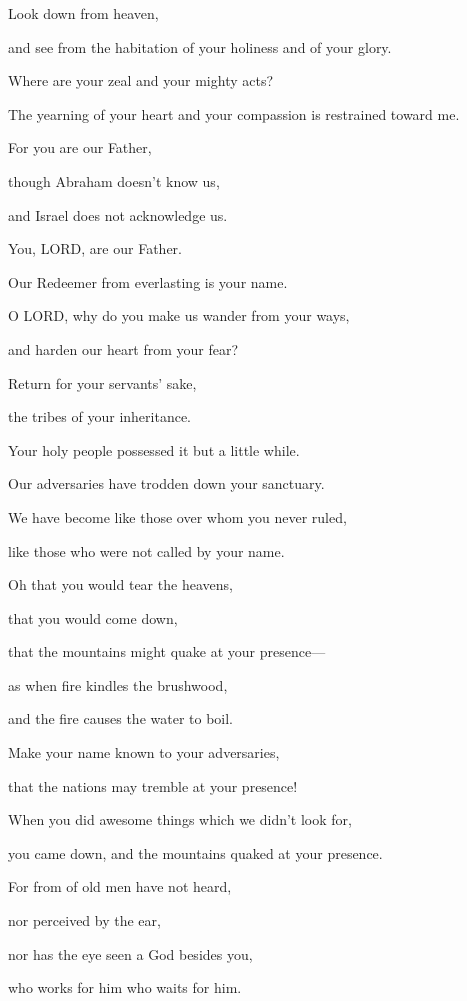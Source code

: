 \vspace{\baselineskip} \myverse{}Look down from heaven,

and see from the habitation of your holiness and of your glory.

Where are your zeal and your mighty acts?

The yearning of your heart and your compassion is restrained toward me.

\myverse{}For you are our Father,

though Abraham doesn’t know us,

and Israel does not acknowledge us.

You, LORD, are our Father.

Our Redeemer from everlasting is your name.

\myverse{}O LORD, why do you make us wander from your ways,

and harden our heart from your fear?

Return for your servants’ sake,

the tribes of your inheritance.

\myverse{}Your holy people possessed it but a little while.

Our adversaries have trodden down your sanctuary.

\myverse{}We have become like those over whom you never ruled,

like those who were not called by your name.


\mychapter{} \myverse*{}Oh that you would tear the heavens,

\quad\quad that you would come down,

that the mountains might quake at your presence—

\myverse{}as when fire kindles the brushwood,

and the fire causes the water to boil.

Make your name known to your adversaries,

that the nations may tremble at your presence!

\myverse{}When you did awesome things which we didn’t look for,

you came down, and the mountains quaked at your presence.

\myverse{}For from of old men have not heard,

nor perceived by the ear,

nor has the eye seen a God besides you,

who works for him who waits for him.

